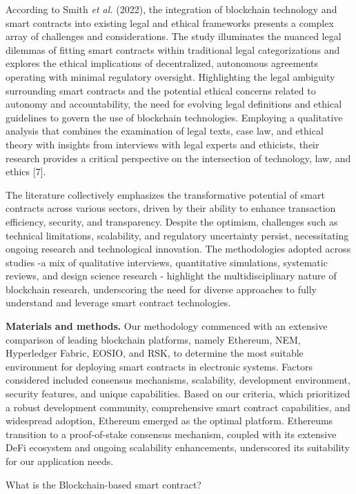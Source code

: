 \begin{multicols}{2}
According to Smith \emph{et al.} (2022), the integration of blockchain
technology and smart contracts into existing legal and ethical
frameworks presents a complex array of challenges and considerations.
The study illuminates the nuanced legal dilemmas of fitting smart
contracts within traditional legal categorizations and explores the
ethical implications of decentralized, autonomous agreements operating
with minimal regulatory oversight. Highlighting the legal ambiguity
surrounding smart contracts and the potential ethical concerns related
to autonomy and accountability, the need for evolving legal definitions
and ethical guidelines to govern the use of blockchain technologies.
Employing a qualitative analysis that combines the examination of legal
texts, case law, and ethical theory with insights from interviews with
legal experts and ethicists, their research provides a critical
perspective on the intersection of technology, law, and ethics {[}7{]}.

The literature collectively emphasizes the transformative potential of
smart contracts across various sectors, driven by their ability to
enhance transaction efficiency, security, and transparency. Despite the
optimism, challenges such as technical limitations, scalability, and
regulatory uncertainty persist, necessitating ongoing research and
technological innovation. The methodologies adopted across studies -a
mix of qualitative interviews, quantitative simulations, systematic
reviews, and design science research - highlight the multidisciplinary
nature of blockchain research, underscoring the need for diverse
approaches to fully understand and leverage smart contract technologies.

{\bfseries Materials and methods.} Our methodology commenced with an
extensive comparison of leading blockchain platforms, namely Ethereum,
NEM, Hyperledger Fabric, EOSIO, and RSK, to determine the most suitable
environment for deploying smart contracts in electronic systems. Factors
considered included consensus mechanisms, scalability, development
environment, security features, and unique capabilities. Based on our
criteria, which prioritized a robust development community,
comprehensive smart contract capabilities, and widespread adoption,
Ethereum emerged as the optimal platform. Ethereum\textquotesingle s
transition to a proof-of-stake consensus mechanism, coupled with its
extensive DeFi ecosystem and ongoing scalability enhancements,
underscored its suitability for our application needs.

What is the Blockchain-based smart contract?


\end{multicols}
